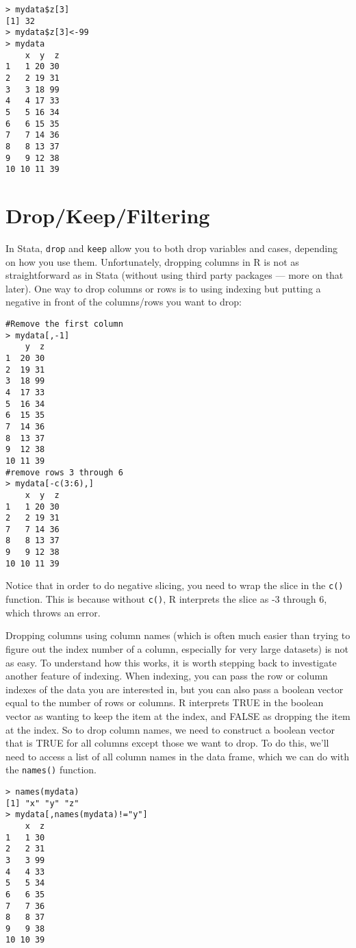 \documentclass[12pt, oneside]{amsart}   	%
\begin{document}
\begin{verbatim}
> mydata$z[3]
[1] 32
> mydata$z[3]<-99
> mydata
    x  y  z
1   1 20 30
2   2 19 31
3   3 18 99
4   4 17 33
5   5 16 34
6   6 15 35
7   7 14 36
8   8 13 37
9   9 12 38
10 10 11 39
\end{verbatim}

\section{Drop/Keep/Filtering}

In Stata, \texttt{drop} and \texttt{keep} allow you to both drop variables and cases, depending on how you use them. Unfortunately, dropping columns in R is not as straightforward as in Stata (without using third party packages --- more on that later). One way to drop columns or rows is to using indexing but putting a negative in front of the columns/rows you want to drop:

\begin{verbatim}
#Remove the first column
> mydata[,-1]
    y  z
1  20 30
2  19 31
3  18 99
4  17 33
5  16 34
6  15 35
7  14 36
8  13 37
9  12 38
10 11 39
#remove rows 3 through 6
> mydata[-c(3:6),]
    x  y  z
1   1 20 30
2   2 19 31
7   7 14 36
8   8 13 37
9   9 12 38
10 10 11 39
\end{verbatim}

Notice that in order to do negative slicing, you need to wrap the slice in the \texttt{c()} function. This is because without \texttt{c()}, R interprets the slice as -3 through 6, which throws an error. 

Dropping columns using column names (which is often much easier than trying to figure out the index number of a column, especially for very large datasets) is not as easy. To understand how this works, it is worth stepping back to investigate another feature of indexing. When indexing, you can pass the row or column indexes of the data you are interested in, but you can also pass a boolean vector equal to the number of rows or columns. R interprets TRUE in the boolean vector as wanting to keep the item at the index, and FALSE as dropping the item at the index. So to drop column names, we need to construct a boolean vector that is TRUE for all columns except those we want to drop. To do this, we'll need to access a list of all column names in the data frame, which we can do with the \texttt{names()} function.

\begin{verbatim}
> names(mydata)
[1] "x" "y" "z"
> mydata[,names(mydata)!="y"]
    x  z
1   1 30
2   2 31
3   3 99
4   4 33
5   5 34
6   6 35
7   7 36
8   8 37
9   9 38
10 10 39
\end{verbatim}
\end{document}
